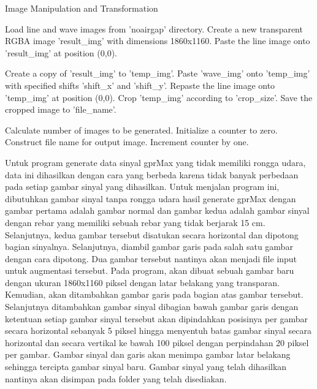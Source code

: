 \begin{algorithm}
  \caption{Image Manipulation and Transformation}
  \begin{algorithmic}[1]
  \State Load line and wave images from 'noairgap' directory.
  \State Create a new transparent RGBA image 'result\_img' with dimensions 1860x1160.
  \State Paste the line image onto 'result\_img' at position (0,0).
  
      \State Create a copy of 'result\_img' to 'temp\_img'.
      \State Paste 'wave\_img' onto 'temp\_img' with specified shifts 'shift\_x' and 'shift\_y'.
      \State Repaste the line image onto 'temp\_img' at position (0,0).
      \State Crop 'temp\_img' according to 'crop\_size'.
      \State Save the cropped image to 'file\_name'.
  \EndFunction
  
  \State Calculate number of images to be generated.
  \State Initialize a counter to zero.
          \State Construct file name for output image.
          \State {}
          \State Increment counter by one.
      \EndFor
  \EndFor
  
  \end{algorithmic}
  \end{algorithm}

Untuk program generate data sinyal gprMax yang tidak memiliki rongga udara, data ini dihasilkan dengan cara yang berbeda karena tidak banyak perbedaan pada setiap gambar sinyal yang dihasilkan. Untuk menjalan program ini, dibutuhkan gambar sinyal tanpa rongga udara hasil generate gprMax dengan gambar pertama adalah gambar normal dan gambar kedua adalah gambar sinyal dengan rebar yang memiliki sebuah rebar yang tidak berjarak 15 cm. Selanjutnya, kedua gambar tersebut disatukan secara horizontal dan dipotong bagian sinyalnya. Selanjutnya, diambil gambar garis pada salah satu gambar dengan cara dipotong. Dua gambar tersebut nantinya akan menjadi file input untuk augmentasi tersebut. Pada program, akan dibuat sebuah gambar baru dengan ukuran 1860x1160 piksel dengan latar belakang yang transparan. Kemudian, akan ditambahkan gambar garis pada bagian atas gambar tersebut. Selanjutnya ditambahkan gambar sinyal dibagian bawah gambar garis dengan ketentuan setiap gambar sinyal tersebut akan dipindahkan posisinya per gambar secara horizontal sebanyak 5 piksel hingga menyentuh batas gambar sinyal secara horizontal dan secara vertikal ke bawah 100 piksel dengan perpindahan 20 piksel per gambar. Gambar sinyal dan garis akan menimpa gambar latar belakang sehingga tercipta gambar sinyal baru. Gambar sinyal yang telah dihasilkan nantinya akan disimpan pada folder yang telah disediakan.

